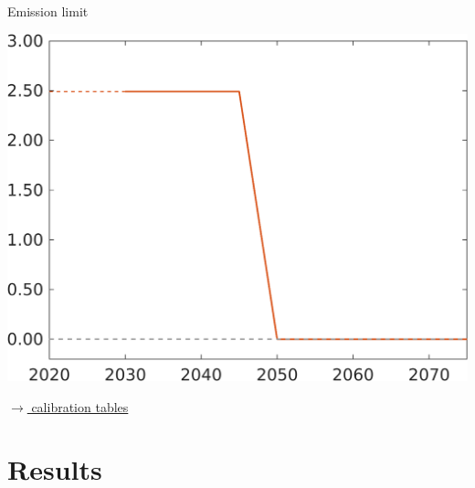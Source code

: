 \documentclass[11pt,aspectratio=169]{beamer}
\begin{document}
\begin{frame}{Emission limit}
	\vspace{6mm}
\centering
	\begin{minipage}[]{0.5\textwidth}
	\includegraphics[width=1\textwidth]{../codding_model/own_basedOnFried/optimalPol_elastS_DisuSci/figures/all_1705/emission_lim.png}
\end{minipage}

\vspace{9mm}
\hfill
\hyperlink{calib}{\tiny{$\rightarrow$ calibration tables}} 

\end{frame}
\hypertarget{resback}{}
\section{Results}
\end{document}
